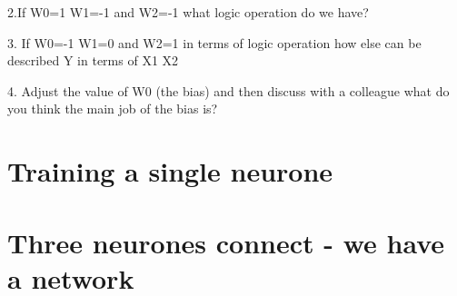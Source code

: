2.If W0=1 W1=-1 and W2=-1  what logic operation do we have?

3. If W0=-1 W1=0 and W2=1  in terms of logic operation how else can be described Y in terms of X1 X2

4. Adjust the value of W0 (the bias) and then discuss with a colleague what do you think the main job of the bias is?

\section{Training a single neurone}

\section{Three neurones connect - we have a network}